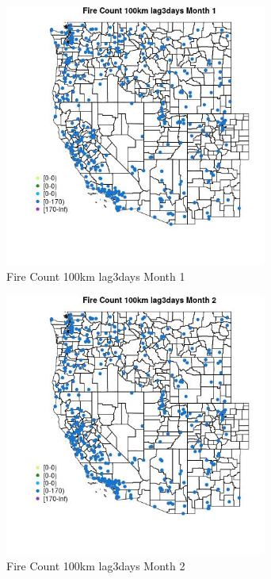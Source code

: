\begin{figure} 
\centering  
\includegraphics[width=0.77\textwidth]{Code_Outputs/Report_ML_input_PM25_Step4_part_e_de_duplicated_aves_compiled_2019-05-18wNAs_MapObsMo1Fire_Count_100km_lag3days.jpg} 
\caption{\label{fig:Report_ML_input_PM25_Step4_part_e_de_duplicated_aves_compiled_2019-05-18wNAsMapObsMo1Fire_Count_100km_lag3days}Fire Count 100km lag3days Month 1} 
\end{figure} 
 

\begin{figure} 
\centering  
\includegraphics[width=0.77\textwidth]{Code_Outputs/Report_ML_input_PM25_Step4_part_e_de_duplicated_aves_compiled_2019-05-18wNAs_MapObsMo2Fire_Count_100km_lag3days.jpg} 
\caption{\label{fig:Report_ML_input_PM25_Step4_part_e_de_duplicated_aves_compiled_2019-05-18wNAsMapObsMo2Fire_Count_100km_lag3days}Fire Count 100km lag3days Month 2} 
\end{figure} 
 


